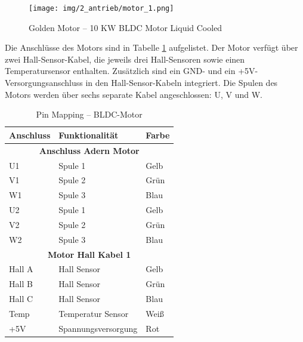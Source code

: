 \pagebreak[1]
\begin{figure}[!ht]
	\begin{center}
		\texttt{[image: img/2\_antrieb/motor\_1.png]}
		\caption{Golden Motor – 10 KW BLDC Motor Liquid Cooled}
		\label{BLDC_Motor:img:antrieb_motor}
	\end{center}
\end{figure}


Die Anschlüsse des Motors sind in Tabelle \ref{BLDC_Motor:tab:pinmapping} aufgelistet. Der Motor verfügt über zwei Hall-Sensor-Kabel, die jeweils drei Hall-Sensoren sowie einen Temperatursensor enthalten. Zusätzlich sind ein GND- und ein +5V-Versorgungsanschluss in den Hall-Sensor-Kabeln integriert. Die Spulen des Motors werden über sechs separate Kabel angeschlossen: U, V und W.
\pagebreak[1]
\begin{table}[!ht]
	\centering
	\caption{Pin Mapping – BLDC-Motor}
	\label{BLDC_Motor:tab:pinmapping}
	\begin{tabular}{lll}
		\hline
		\textbf{Anschluss}          & \textbf{Funktionalität} & \textbf{Farbe} \\ \hline
		\multicolumn{3}{c}{\textbf{Anschluss Adern Motor}}                     \\ \hline
		\multicolumn{1}{l|}{U1}     & Spule 1                 & Gelb           \\
		\multicolumn{1}{l|}{V1}     & Spule 2                 & Grün           \\
		\multicolumn{1}{l|}{W1}     & Spule 3                 & Blau           \\
		\multicolumn{1}{l|}{U2}     & Spule 1                 & Gelb           \\
		\multicolumn{1}{l|}{V2}     & Spule 2                 & Grün           \\
		\multicolumn{1}{l|}{W2}     & Spule 3                 & Blau           \\ \hline
		\multicolumn{3}{c}{\textbf{Motor Hall Kabel 1}}                        \\ \hline
		\multicolumn{1}{l|}{Hall A} & Hall Sensor             & Gelb           \\
		\multicolumn{1}{l|}{Hall B} & Hall Sensor             & Grün           \\
		\multicolumn{1}{l|}{Hall C} & Hall Sensor             & Blau           \\
		\multicolumn{1}{l|}{Temp}   & Temperatur Sensor       & Weiß           \\
		\multicolumn{1}{l|}{+5V}    & Spannungsversorgung     & Rot            \\

\end{tabular}
\end{table}
